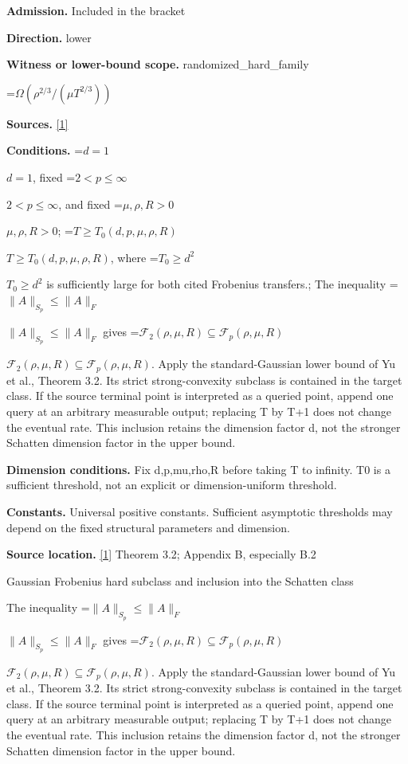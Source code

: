 \documentclass[10pt,a4paper]{article}
\newcommand{\AtlasMath}[1]{\par\begingroup\centering\setbox0=\hbox{$\displaystyle #1$}\ifdim\wd0>1.4\linewidth\typeout{ATLAS WIDE FORMULA: \the\wd0}\fi\ifdim\wd0>\linewidth\resizebox{\linewidth}{!}{\box0}\else\box0\fi\par\endgroup}
\newcommand{\AtlasInlineMath}[1]{\begingroup\setbox0=\hbox{$#1$}\ifdim\wd0>.4\linewidth\endgroup\AtlasMath{#1}\else\endgroup$#1$\fi}
\begin{document}
\textbf{Admission.} Included in the bracket



\textbf{Direction.} lower



\textbf{Witness or lower-bound scope.} randomized\_hard\_family



\AtlasMath{\Omega(\rho^{2/3}/(\mu T^{2/3}))}


\textbf{Sources.} \href{https://papers.nips.cc/paper_files/paper/2024/file/b444ad72520a5f5c467343be88e352ed-Paper-Conference.pdf}{[1]}



\textbf{Conditions.} \AtlasInlineMath{d=1}, fixed \AtlasInlineMath{2<p\le\infty}, and fixed \AtlasInlineMath{\mu,\rho,R>0}; \AtlasInlineMath{T\ge T_0(d,p,\mu,\rho,R)}, where \AtlasInlineMath{T_0\ge d^2} is sufficiently large for both cited Frobenius transfers.; The inequality \AtlasInlineMath{\|A\|_{S_p}\le\|A\|_F} gives \AtlasInlineMath{\mathcal F_2(\rho,\mu,R)\subseteq\mathcal F_p(\rho,\mu,R)}. Apply the standard-Gaussian lower bound of Yu et al., Theorem 3.2. Its strict strong-convexity subclass is contained in the target class. If the source terminal point is interpreted as a queried point, append one query at an arbitrary measurable output; replacing T by T+1 does not change the eventual rate. This inclusion retains the dimension factor d, not the stronger Schatten dimension factor in the upper bound.



\textbf{Dimension conditions.} Fix d,p,mu,rho,R before taking T to infinity. T0 is a sufficient threshold, not an explicit or dimension-uniform threshold.



\textbf{Constants.} Universal positive constants. Sufficient asymptotic thresholds may depend on the fixed structural parameters and dimension.



\textbf{Source location.} \href{https://papers.nips.cc/paper_files/paper/2024/file/b444ad72520a5f5c467343be88e352ed-Paper-Conference.pdf}{[1]} Theorem 3.2; Appendix B, especially B.2



Gaussian Frobenius hard subclass and inclusion into the Schatten class



The inequality \AtlasInlineMath{\|A\|_{S_p}\le\|A\|_F} gives \AtlasInlineMath{\mathcal F_2(\rho,\mu,R)\subseteq\mathcal F_p(\rho,\mu,R)}. Apply the standard-Gaussian lower bound of Yu et al., Theorem 3.2. Its strict strong-convexity subclass is contained in the target class. If the source terminal point is interpreted as a queried point, append one query at an arbitrary measurable output; replacing T by T+1 does not change the eventual rate. This inclusion retains the dimension factor d, not the stronger Schatten dimension factor in the upper bound.
\end{document}
